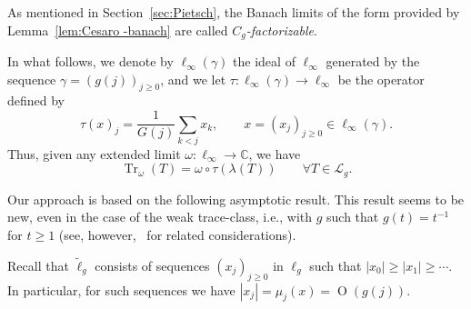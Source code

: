 \documentclass[10pt, a4paper]{amsart}
\newcommand{\C}{\mathbb{C}}
\newcommand{\sL}{\mathscr{L}}
\newcommand{\op}{\operatorname}
\newcommand{\Tr}{\op{Tr}}
\newcommand{\Trw}{\Tr_{\omega}}
\numberwithin{equation}{section}
\theoremstyle{definition}
\theoremstyle{remark}
\begin{document}
As mentioned in Section~\ref{sec:Pietsch}, the Banach limits of the form provided by Lemma~\ref{lem:Cesaro -banach} are called \emph{$C_g$-factorizable}. 


In what follows, we denote by $\ell_\infty(\gamma)$ the ideal of $\ell_\infty$ generated by the sequence $\gamma=(g(j))_{j\geq 0}$, and we let 
$\tau:\ell_\infty(\gamma)\rightarrow \ell_\infty$ be the operator defined by
\begin{equation*}
 \tau(x)_j = \frac{1}{G(j)}\sum_{k<j} x_k, \qquad x=(x_j)_{j\geq 0}\in \ell_\infty(\gamma).
\end{equation*}
Thus, given any extended limit $\omega:\ell_\infty \rightarrow \C$, we have
\begin{equation*}
 \Trw(T)=\omega\circ \tau (\lambda(T)) \qquad \forall T\in \sL_g.
\end{equation*}

Our approach is based on the following asymptotic result. This result seems to be new, even in the case of the weak trace-class, i.e., with $g$ such that $g(t)=t^{-1}$ for $t\geq 1$  (see, however,~\cite[p.\ 206]{LSZ:Book} for related considerations).

Recall that $\tilde{\ell}_g$ consists of sequences $(x_j)_{j\geq 0}$ in $\ell_g$ such that $|x_0|\geq |x_1|\geq \cdots$. In particular, for such sequences we have $|x_j|=\mu_j(x)=\op{O}(g(j))$.
\end{document}
